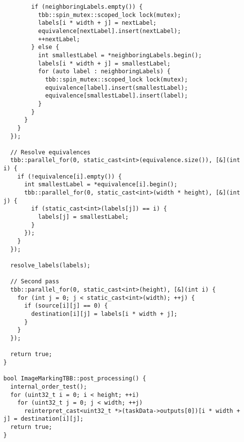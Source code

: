 \documentclass[a4paper, 14pt]{article}
\begin{document}
\begin{verbatim}
        if (neighboringLabels.empty()) {
          tbb::spin_mutex::scoped_lock lock(mutex);
          labels[i * width + j] = nextLabel;
          equivalence[nextLabel].insert(nextLabel);
          ++nextLabel;
        } else {
          int smallestLabel = *neighboringLabels.begin();
          labels[i * width + j] = smallestLabel;
          for (auto label : neighboringLabels) {
            tbb::spin_mutex::scoped_lock lock(mutex);
            equivalence[label].insert(smallestLabel);
            equivalence[smallestLabel].insert(label);
          }
        }
      }
    }
  });

  // Resolve equivalences
  tbb::parallel_for(0, static_cast<int>(equivalence.size()), [&](int i) {
    if (!equivalence[i].empty()) {
      int smallestLabel = *equivalence[i].begin();
      tbb::parallel_for(0, static_cast<int>(width * height), [&](int j) {
        if (static_cast<int>(labels[j]) == i) {
          labels[j] = smallestLabel;
        }
      });
    }
  });

  resolve_labels(labels);

  // Second pass
  tbb::parallel_for(0, static_cast<int>(height), [&](int i) {
    for (int j = 0; j < static_cast<int>(width); ++j) {
      if (source[i][j] == 0) {
        destination[i][j] = labels[i * width + j];
      }
    }
  });

  return true;
}

bool ImageMarkingTBB::post_processing() {
  internal_order_test();
  for (uint32_t i = 0; i < height; ++i)
    for (uint32_t j = 0; j < width; ++j)
      reinterpret_cast<uint32_t *>(taskData->outputs[0])[i * width + j] = destination[i][j];
  return true;
}
	\end{verbatim}
\end{document}
